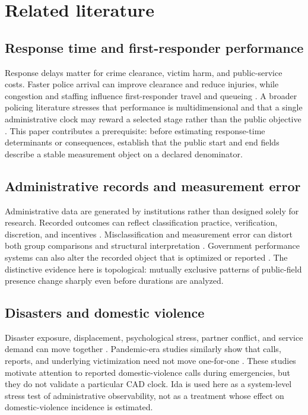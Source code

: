 \documentclass[11pt]{article}
\begin{document}
\section{Related literature}

\subsection{Response time and first-responder performance}

Response delays matter for crime clearance, victim harm, and public-service costs. Faster police arrival can improve clearance and reduce injuries, while congestion and staffing influence first-responder travel and queueing \citep{BlanesKirchmaier2018,DeAngeloTogerWeisburd2023,BrentBeland2020,MourtgosAdamsNix2024}. A broader policing literature stresses that performance is multidimensional and that a single administrative clock may reward a selected stage rather than the public objective \citep{MooreBraga2004,TiwanaBassFarrell2015,VerlaanRuiter2023}. This paper contributes a prerequisite: before estimating response-time determinants or consequences, establish that the public start and end fields describe a stable measurement object on a declared denominator.

\subsection{Administrative records and measurement error}

Administrative data are generated by institutions rather than designed solely for research. Recorded outcomes can reflect classification practice, verification, discretion, and incentives \citep{KlingerBridges1997,BoivinCordeau2011,BoivinOuellet2014,SimpsonOrosco2021}. Misclassification and measurement error can distort both group comparisons and structural interpretation \citep{KapteynYpma2007,ChenHongNekipelov2011,KnoxLoweMummolo2020}. Government performance systems can also alter the recorded object that is optimized or reported \citep{CourtyMarschke1997,Eckhouse2022}. The distinctive evidence here is topological: mutually exclusive patterns of public-field presence change sharply even before durations are analyzed.

\subsection{Disasters and domestic violence}

Disaster exposure, displacement, psychological stress, partner conflict, and service demand can move together \citep{AnastarioShehabLawry2009,SchumacherEtAl2010,HarvilleTaylorTesfai2011,FirstEtAl2022}. Pandemic-era studies similarly show that calls, reports, and underlying victimization need not move one-for-one \citep{MillerSegal2019,BullingerCarrPackham2021,MillerSegalSpencer2024}. These studies motivate attention to reported domestic-violence calls during emergencies, but they do not validate a particular CAD clock. Ida is used here as a system-level stress test of administrative observability, not as a treatment whose effect on domestic-violence incidence is estimated.
\end{document}
